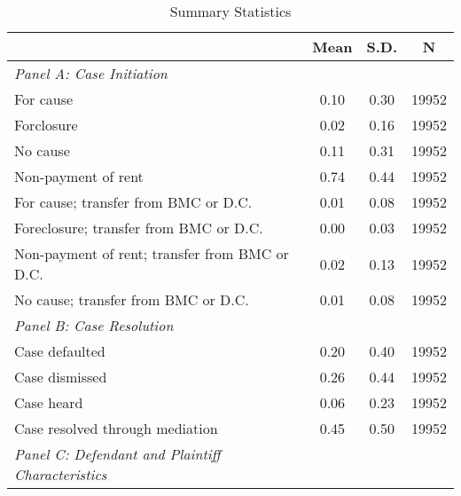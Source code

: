 \begin{table}[htbp]\centering
\def\sym#1{\ifmmode^{#1}\else\(^{#1}\)\fi}
\caption{Summary Statistics}
\begin{tabular}{l*{1}{ccc}}
\toprule
                    &        Mean&        S.D.&           N\\
\midrule
\emph{Panel A: Case Initiation}&            &            &            \\
\hspace{0.25cm}For cause&        0.10&        0.30&       19952\\
\hspace{0.25cm}Forclosure&        0.02&        0.16&       19952\\
\hspace{0.25cm}No cause&        0.11&        0.31&       19952\\
\hspace{0.25cm}Non-payment of rent&        0.74&        0.44&       19952\\
\hspace{0.25cm}For cause; transfer from BMC or D.C.&        0.01&        0.08&       19952\\
\hspace{0.25cm}Foreclosure; transfer from BMC or D.C.&        0.00&        0.03&       19952\\
\hspace{0.25cm}Non-payment of rent; transfer from BMC or D.C.&        0.02&        0.13&       19952\\
\hspace{0.25cm}No cause; transfer from BMC or D.C.&        0.01&        0.08&       19952\\
\emph{Panel B: Case Resolution}&            &            &            \\
\hspace{0.25cm}Case defaulted&        0.20&        0.40&       19952\\
\hspace{0.25cm}Case dismissed&        0.26&        0.44&       19952\\
\hspace{0.25cm}Case heard&        0.06&        0.23&       19952\\
\hspace{0.25cm}Case resolved through mediation&        0.45&        0.50&       19952\\
\emph{Panel C: Defendant and Plaintiff Characteristics}&            &            &            \\

\end{tabular}
\end{table}
